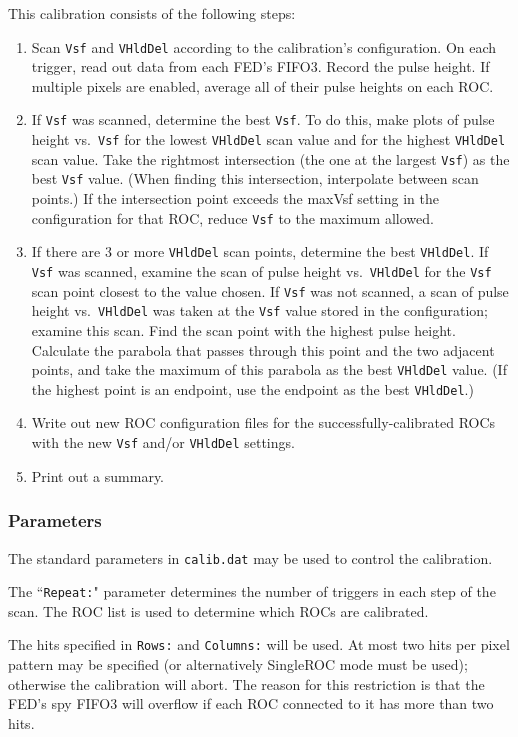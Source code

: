 This calibration consists of the following steps:
\begin{enumerate}
\item Scan \verb|Vsf| and \verb|VHldDel| according to the calibration's configuration.  On each trigger, read out data from each FED's FIFO3.  Record the pulse height.  If multiple pixels are enabled, average all of their pulse heights on each ROC.
\item If \verb|Vsf| was scanned, determine the best \verb|Vsf|.  To do this, make plots of pulse height vs.~\verb|Vsf| for the lowest \verb|VHldDel| scan value and for the highest \verb|VHldDel| scan value.  Take the rightmost intersection (the one at the largest \verb|Vsf|) as the best \verb|Vsf| value.  (When finding this intersection, interpolate between scan points.)  If the intersection point exceeds the maxVsf setting in the configuration for that ROC, reduce \verb|Vsf| to the maximum allowed.
\item If there are 3 or more \verb|VHldDel| scan points, determine the best \verb|VHldDel|.  If \verb|Vsf| was scanned, examine the scan of pulse height vs.~\verb|VHldDel| for the \verb|Vsf| scan point closest to the value chosen.  If \verb|Vsf| was not scanned, a scan of pulse height vs.~\verb|VHldDel| was taken at the \verb|Vsf| value stored in the configuration; examine this scan.  Find the scan point with the highest pulse height.  Calculate the parabola that passes through this point and the two adjacent points, and take the maximum of this parabola as the best \verb|VHldDel| value.  (If the highest point is an endpoint, use the endpoint as the best \verb|VHldDel|.)
\item Write out new ROC configuration files for the successfully-calibrated
ROCs with the new \verb|Vsf| and/or \verb|VHldDel| settings.
\item Print out a summary.
\end{enumerate}

\subsubsection{Parameters}
The standard parameters in \verb|calib.dat| may be used to control the
calibration.

The ``\verb|Repeat:|" parameter determines the number of triggers in each step
of the scan.  The ROC list is used to determine which ROCs are calibrated.

The hits specified in \verb|Rows:| and \verb|Columns:| will be
used.  At most two hits per pixel pattern may be specified (or alternatively SingleROC mode must be used); otherwise the calibration will abort.  The reason for this restriction is that the FED's spy FIFO3 will overflow if each ROC connected to it has more than two hits.

